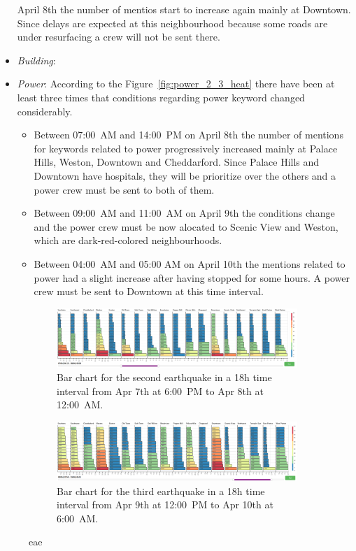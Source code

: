 \begin{itemize}
April 8th the number of mentios start to increase again mainly at Downtown.
Since delays are expected at this neighbourhood because some roads are under
resurfacing a crew  will not be sent there. 
\item \emph{Building}: 
\item \emph{Power}: According to the Figure~\ref{fig:power_2_3_heat} there have
been at least three times that conditions regarding power keyword changed considerably.
\begin{itemize}                                                              
          \item Between 07:00~AM and 14:00~PM on April 8th the number of
mentions for keywords related to power progressively increased mainly at Palace Hills, Weston,
Downtown and Cheddarford. Since Palace Hills and Downtown have hospitals, they
will be prioritize over the others and a power crew must be sent to both of them.                                                                  
          \item Between 09:00~AM and 11:00~AM on April 9th the conditions
change and the power crew must be now alocated to Scenic View and Weston, which
are dark-red-colored neighbourhoods.
\item Between 04:00~AM and 05:00 AM on April 10th the mentions related to power
had a slight increase after having stopped for some hours. A power crew must be
sent to Downtown at this time interval.
      \end{itemize}
\end{itemize}          
 
\begin{figure}[!h]
    \centering
    \begin{subfigure}[!h]{0.98\textwidth}
        \centering
        \includegraphics[width=1.00\textwidth]{figs/q2/eq_2_hbar.png}
        \caption{Bar chart for the second earthquake in a 18h time interval from
        Apr 7th at 6:00~PM to Apr 8th at 12:00~AM.}
        \label{fig:eq_2_hbar}
    \end{subfigure}
    \begin{subfigure}[!h]{0.98\textwidth}
        \centering
        \includegraphics[width=1.00\textwidth]{figs/q2/eq_3_hbar.png}
        \caption{Bar chart for the third earthquake in a 18h time interval from
        Apr 9th at 12:00~PM to Apr 10th at 6:00~AM.}
        \label{fig:eq_3_hbar}
    \end{subfigure}
    \caption{eae}
    \label{fig:eq_2_3_hbar}
\end{figure}

